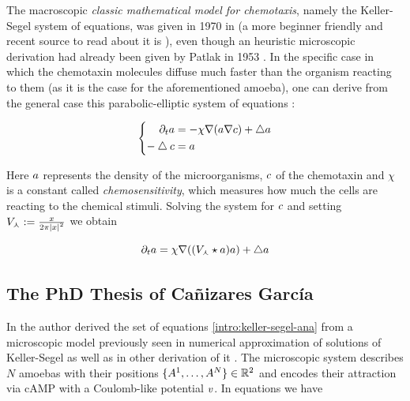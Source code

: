 The macroscopic \emph{classic mathematical model for chemotaxis}, namely the Keller-Segel system of equations, was given in 1970 in \cite{keller-segel} (a more beginner friendly and recent source to read about it is \cite{guide-pdes-chemotaxis}), even though an heuristic microscopic derivation had already been given by Patlak in 1953 \cite{patlak}.
In the specific case in which the chemotaxin molecules diffuse much faster than the organism reacting to them (as it is the case for the aforementioned amoeba), one can derive from the general case this parabolic-elliptic system of equations \cite{keller-segel-reduced}:

\begin{equation}\label{intro:keller-segel-ana}
	\left\{
	\begin{aligned}
		\partial_t a &= - \chi \nabla (a \nabla c) + \bigtriangleup a
		\\
		-\bigtriangleup c &= a
	\end{aligned}
	\right.
\end{equation}

Here $a$ represents the density of the microorganisms, $c$ of the chemotaxin and $\chi$ is a constant called \emph{chemosensitivity}, which measures how much the cells are reacting to the chemical stimuli.
Solving the system \label{intro:keller-segel-ana} for $c$ and setting $V_\curlywedge:=\frac{x}{2\pi \left| x \right|^2}$ we obtain

\begin{equation}\label{intro:keller-segel-ana-1-equation}
	\partial_t a = \chi \nabla ( (V_\curlywedge \star a) a) + \bigtriangleup a
\end{equation}

\subsection{The PhD Thesis of Cañizares García}

In \cite{ana} the author derived the set of equations \ref{intro:keller-segel-ana} from a microscopic model previously seen in numerical approximation of solutions of Keller-Segel \cite{numerics-keller-segel} as well as in other derivation of it \cite{keller-segel-dd-derivation-previously}.
The microscopic system describes $N$ amoebas with their positions $\{A^1, \ldots, A^N\}\in\mathbb{R}^2$ and encodes their attraction via cAMP with a Coulomb-like potential $v$.
In equations we have

